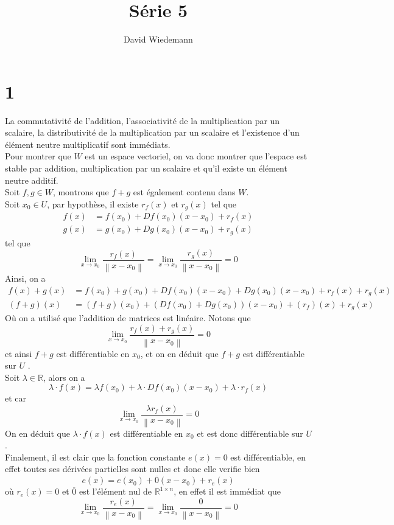\documentclass[11pt, a4paper]{article}
\newcommand\N[1]{\left\lVert#1\right\rVert}
\begin{document}
\title{Série 5}
\author{David Wiedemann	}
\maketitle
\section*{1}
La commutativité de l'addition, l'associativité de la multiplication par un scalaire, la distributivité de la multiplication par un scalaire et l'existence d'un élément neutre multiplicatif sont immédiats.\\
Pour montrer que $W$ est un espace vectoriel, on va donc montrer que l'espace est stable par addition, multiplication par un scalaire et qu'il existe un élément neutre additif.\\
Soit $f,g \in W$, montrons que $f+g$ est également contenu dans $W$.\\
Soit $x_0 \in U$, par hypothèse, il existe $r_f( x) $ et $r_g( x) $ tel que
\begin{align*}
	f( x) &= f( x_0) + Df( x_0) ( x-x_0)  + r_f( x) \\
	g( x) &= g( x_0)  + Dg( x_0) ( x-x_0)  + r_g( x) 
\end{align*}
tel que
\[ 
	\lim_{x \to x_0} \frac{r_f( x) }{\N{x-x_0}} = 	\lim_{x \to x_0} \frac{r_g( x) }{\N{x-x_0}} = 0
\]
Ainsi, on a
\begin{align*}
	f( x) + g( x) &= f( x_0) + g( x_0) + Df( x_0) ( x-x_0) + Dg( x_0) ( x-x_0) + r_f( x)  + r_g( x) \\
	( f+g) ( x) &= ( f+g) ( x_0)  + ( Df( x_0) + Dg( x_0) ) ( x-x_0)  + ( r_f) ( x) + r_g(x ) 
\end{align*}
Où on a utilisé que l'addition de matrices est linéaire.
Notons que
\[ 
	\lim_{x \to x_0} \frac{r_f( x) + r_g( x) }{\N{x-x_0}} = 0
\]
et ainsi $f+g$ est différentiable en $x_0$, et on en déduit que $f+g$ est différentiable sur $U$ .\\
Soit $\lambda \in \mathbb{R}$, alors on a
\[ 
	\lambda \cdot f( x) = \lambda f( x_0)  + \lambda \cdot Df( x_0) ( x-x_0)  + \lambda \cdot r_f( x) 
\]
et car
\[ 
	\lim_{x \to x_0} \frac{\lambda r_f( x) }{\N{x-x_0}} = 0
\]
On en déduit que $\lambda \cdot f( x) $ est différentiable en $x_0$ et est donc différentiable sur $U$.\\
Finalement, il est clair que la fonction constante $e( x) = 0$ est différentiable, en effet toutes ses dérivées partielles sont nulles et donc elle verifie bien
\[ 
	e( x) = e( x_0)  + \overline{0}( x-x_0)  + r_e( x) 
\]
où $r_e( x) = 0$ et $\overline{0}$ est l'élément nul de $\mathbb{R}^{1\times n}$, en effet il est immédiat que
\[ 
	\lim_{x \to x_0} \frac{r_e( x) }{\N { x-x_0} } = \lim_{x \to x_0} \frac{0}{\N { x-x_0} } = 0
\]
\end{document}
